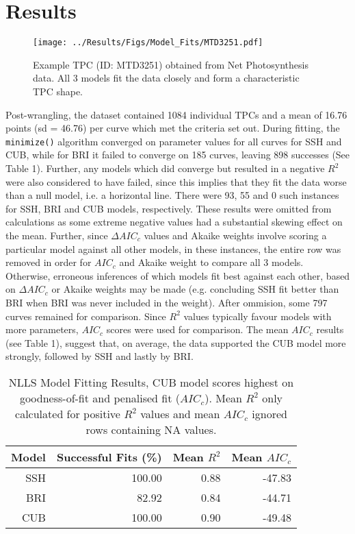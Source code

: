 \documentclass[11pt]{article}
\begin{document}
    \section{Results}
    \begin{wrapfigure}{R}{0.5\textwidth}
        \centering
        \texttt{[image: ../Results/Figs/Model\_Fits/MTD3251.pdf]}
        \caption{Example TPC (ID: MTD3251) obtained from Net Photosynthesis data. All 3 models fit the data closely and form a  characteristic TPC shape.}
    \end{wrapfigure}
    Post-wrangling, the dataset contained 1084 individual TPCs and a mean of 16.76 points (sd = 46.76) per curve which met the criteria set out. During fitting, the \texttt{minimize()} algorithm converged on parameter values for all curves for SSH and CUB, while for BRI it failed to converge on 185 curves, leaving 898 successes (See Table 1). Further, any models which did converge but resulted in a negative $R^2$ were also considered to have failed, since this implies that they fit the data worse than a null model, i.e. a horizontal line. There were 93, 55 and 0 such instances for SSH, BRI and CUB models, respectively. These results were omitted from calculations as some extreme negative values had a substantial skewing effect on the mean. Further, since $\Delta AIC_c$ values and Akaike weights involve scoring a particular model against all other models, in these instances, the entire row was removed in order for $AIC_c$ and Akaike weight to compare all 3 models. Otherwise, erroneous inferences of which models fit best against each other, based on $\Delta AIC_c$ or Akaike weights may be made (e.g. concluding SSH fit better than BRI when BRI was never included in the weight). After ommision, some 797 curves remained for comparison.
    Since $R^2$ values typically favour models with more parameters, $AIC_c$ scores were used for comparison. The mean $AIC_c$ results (see Table 1), suggest that, on average, the data supported the CUB model more strongly, followed by SSH and lastly by BRI.
    
    \begin{table}[ht]
        \caption{NLLS Model Fitting Results, CUB model scores highest on goodness-of-fit and penalised fit ($AIC_c$). Mean $R^2$ only calculated for positive $R^2$ values and mean $AIC_c$ ignored rows containing NA values.}
        \centering
        \begin{tabular}{rrrr}
        \hline
        Model & Successful Fits (\%) & Mean $R^2$ & Mean $AIC_c$ \\ 
        \hline
        SSH & 100.00 & 0.88 & -47.83 \\ 
        BRI & 82.92 & 0.84 & -44.71 \\ 
        CUB & 100.00 & 0.90 & -49.48 \\ 
        \hline
        \end{tabular}
    \end{table}
\end{document}
